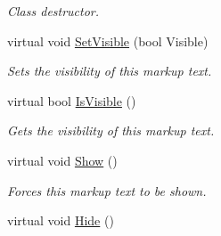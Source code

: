 \begin{DoxyCompactItemize}
\begin{DoxyCompactList}\small\item\em Class destructor. \item\end{DoxyCompactList}\item 
virtual void \hyperlink{classphys_1_1UI_1_1MarkupText_ac5c38c21af2fbc3533697cacfec8fdc3}{SetVisible} (bool Visible)
\begin{DoxyCompactList}\small\item\em Sets the visibility of this markup text. \item\end{DoxyCompactList}\item 
virtual bool \hyperlink{classphys_1_1UI_1_1MarkupText_a17873359c7387926c7e759665ad4312d}{IsVisible} ()
\begin{DoxyCompactList}\small\item\em Gets the visibility of this markup text. \item\end{DoxyCompactList}\item 
\hypertarget{classphys_1_1UI_1_1MarkupText_a223df1155960fd6a4ddde7a43e87fa09}{
virtual void \hyperlink{classphys_1_1UI_1_1MarkupText_a223df1155960fd6a4ddde7a43e87fa09}{Show} ()}
\label{d7/d23/classphys_1_1UI_1_1MarkupText_a223df1155960fd6a4ddde7a43e87fa09}

\begin{DoxyCompactList}\small\item\em Forces this markup text to be shown. \item\end{DoxyCompactList}\item 
\hypertarget{classphys_1_1UI_1_1MarkupText_ad0a4b1d27341426d08d367c4891c23f9}{
virtual void \hyperlink{classphys_1_1UI_1_1MarkupText_ad0a4b1d27341426d08d367c4891c23f9}{Hide} ()}
\label{d7/d23/classphys_1_1UI_1_1MarkupText_ad0a4b1d27341426d08d367c4891c23f9}


\end{DoxyCompactItemize}
